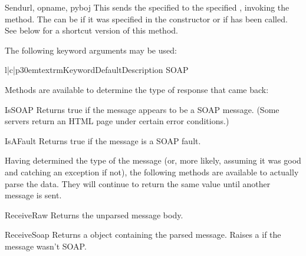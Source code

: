 \begin{methoddesc}{Send}{url, opname, pyboj}
This sends the specified  to the specified , invoking
the  method.
The  can be  if it was specified in the 
constructor or if  has been called.
See below for a shortcut version of this method.

The following keyword arguments may be used:

\begin{tableiii}{l|c|p{30em}}{textrm}{Keyword}{Default}{Description}
    SOAP 
\end{tableiii}

\end{methoddesc}

Methods are available to determine the type of response that came back:

\begin{methoddesc}{IsSOAP}{}
Returns true if the message appears to be a SOAP message.
(Some servers return an HTML page under certain error conditions.)
\end{methoddesc}

\begin{methoddesc}{IsAFault}{}
Returns true if the message is a SOAP fault.
\end{methoddesc}

Having determined the type of the message (or, more likely, assuming
it was good and catching an exception if not), the following methods
are available to actually parse the data.
They will continue to return the same value until
another message is sent.

\begin{methoddesc}{ReceiveRaw}{}
Returns the unparsed message body.
\end{methoddesc}

\begin{methoddesc}{ReceiveSoap}{}
Returns a  object containing the parsed message.
Raises a  if the message wasn't SOAP.
\end{methoddesc}

